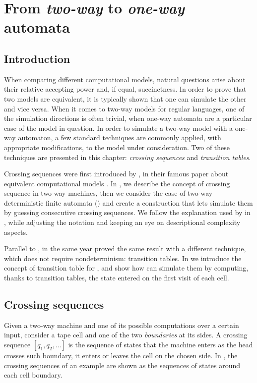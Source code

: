 \chapter{From \emph{two-way} to \emph{one-way} automata}\label{ch:techniques}



\section{Introduction}
When comparing different computational models, natural questions arise about their relative accepting power and, if equal, succinctness.
In order to prove that two models are equivalent, it is typically shown that one can simulate the other and vice versa.
When it comes to two-way models for regular languages, one of the simulation directions is often trivial, when one-way automata are a particular case of the model in question.
In order to simulate a two-way model with a one-way automaton, a few standard techniques are commonly applied, with appropriate modifications, to the model under consideration.
Two of these techniques are presented in this chapter: \emph{crossing sequences} and \emph{transition tables}.

Crossing sequences were first introduced by \citeauthor{RabSco59}, in their famous \citeyear{RabSco59} paper about equivalent computational models \cite{RabSco59}.
In , we describe the concept of crossing sequence in two-way machines, then we consider the case of two-way deterministic finite automata (\TDFA) and create a construction that lets \ONFAs simulate them by guessing consecutive crossing sequences.
We follow the explanation used by \citeauthor{HopUll79} in \cite{HopUll79}, while adjusting the notation and keeping an eye on descriptional complexity aspects.

Parallel to \citeauthor{RabSco59}, in the same year \citeauthor{She59} proved the same result with a different technique, which does not require nondeterminism: transition tables.
In  we introduce the concept of transition table for \TDFAs, and show how \DFAs can simulate them by computing, thanks to transition tables, the state entered on the first visit of each cell.


\section{Crossing sequences}\label{sec:crossseq2DFA}
Given a two-way machine and one of its possible computations over a certain input, consider a tape cell and one of the two \emph{boundaries} at its sides.
A crossing sequence $[q_1,q_2,\dots]$ is the sequence of states that the machine enters as the head crosses such boundary, \ie it enters or leaves the cell on the chosen side.
In , the crossing sequences of an example \TDFA are shown as the sequences of states around each cell boundary.

